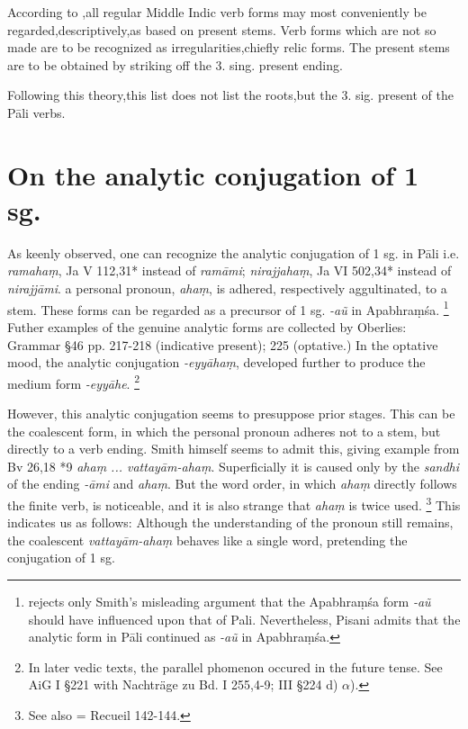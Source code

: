 \documentclass[11pt]{article}
\newcommand*\ṛ{r\symbol{"325}}
\newcommand*\Ṛ{R\symbol{"325}}
\newcommand*\ṝ{r\symbol{"304}\symbol{"325}}
\newcommand*\Ṝ{R\symbol{"304}\symbol{"325}}
\newcommand*\ḷ{l\symbol{"325}}
\newcommand*\ḹ{l\symbol{"304}\symbol{"325}}
\newcommand*\Ḷ{L\symbol{"325}}
\newcommand*\Ḹ{L\symbol{"304}\symbol{"325}}
\begin{document}
According to \citet[78]{Edgerton:1954},all regular Middle Indic verb forms may most conveniently be regarded,descriptively,as based on present stems.
Verb forms which are not so made are to be recognized as irregularities,chiefly relic forms.
The present stems are to be obtained by striking off the 3. sing. present ending.

Following this theory,this list does not list the roots,but the 3. sig. present of the Pāli verbs.

\section{On the analytic conjugation of 1 sg.}
As \citet{Smith:1932} keenly observed, one can recognize the analytic conjugation of 1 sg. in Pāli i.e. \textit{ramahaṃ}, Ja V 112,31* instead of \textit{ramāmi};
\textit{nirajjahaṃ}, Ja VI 502,34* instead of \textit{nirajjāmi}.
a personal pronoun, \textit{ahaṃ}, is adhered, respectively aggultinated, to a stem.
These forms can be regarded as a precursor of 1 sg. \textit{-a\~{u}} in Apabhraṃ\'{s}a.%
\footnote{\citet[9]{pisani:1952} rejects only Smith's misleading argument that the Apabhraṃ\'{s}a form \textit{-a\~{u}} should have influenced upon that of Pali.
Nevertheless, Pisani admits that the analytic form in Pāli continued as \textit{-a\~{u}} in Apabhraṃ\'{s}a.}
Futher examples of the genuine analytic forms are collected by Oberlies: Grammar \S 46 pp. 217-218 (indicative present); 225 (optative.)
In the optative mood, the analytic conjugation \textit{-eyyāhaṃ}, developed further to produce the medium form \textit{-eyyāhe}.%
\footnote{In later vedic texts, the parallel phomenon occured in the future tense.
See AiG I \S 221 with Nachträge zu Bd. I 255,4-9; III \S 224 d) $\alpha$).}

However, this analytic conjugation seems to presuppose prior stages.
This can be the coalescent form, in which the personal pronoun adheres not to a stem, but directly to a verb ending.
Smith himself seems to admit this, giving example from Bv 26,18 *9 \textit{ahaṃ ... vattayām-ahaṃ}.
Superficially it is caused only by the \textit{sandhi} of the ending \textit{-āmi} and \textit{ahaṃ}.
But the word order, in which \textit{ahaṃ} directly follows the finite verb, is noticeable,
and it is also strange that \textit{ahaṃ} is twice used.%
\footnote{See also \citet[114-116]{bloch:1927} = Recueil 142-144.}
This indicates us as follows: Although the understanding of the pronoun still remains,
the coalescent \textit{vattayām-ahaṃ} behaves like a single word,
pretending the conjugation of 1 sg.
\end{document}
